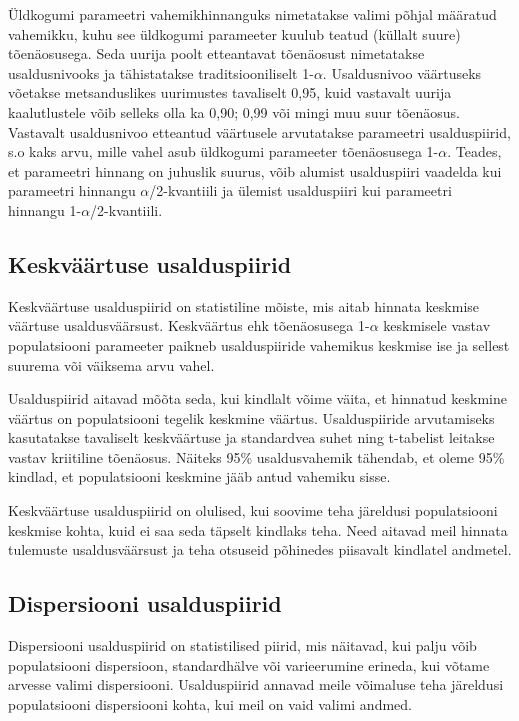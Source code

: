 \documentclass[
]{book}
\begin{document}
Üldkogumi parameetri vahemikhinnanguks nimetatakse valimi põhjal määratud vahemikku, kuhu see üldkogumi parameeter kuulub teatud (küllalt suure) tõenäosusega. Seda uurija poolt etteantavat tõenäosust nimetatakse usaldusnivooks ja tähistatakse traditsiooniliselt 1-\(\alpha\). Usaldusnivoo väärtuseks võetakse metsanduslikes uurimustes tavaliselt 0,95, kuid vastavalt uurija kaalutlustele võib selleks olla ka 0,90; 0,99 või mingi muu suur tõenäosus. Vastavalt usaldusnivoo etteantud väärtusele arvutatakse parameetri usalduspiirid, s.o kaks arvu, mille vahel asub üldkogumi parameeter tõenäosusega 1-\(\alpha\). Teades, et parameetri hinnang on juhuslik suurus, võib alumist usalduspiiri vaadelda kui parameetri hinnangu \(\alpha\)/2-kvantiili ja ülemist usalduspiiri kui parameetri hinnangu 1-\(\alpha\)/2-kvantiili.

\subsection{Keskväärtuse usalduspiirid}\label{keskvuxe4uxe4rtuse-usalduspiirid}

Keskväärtuse usalduspiirid on statistiline mõiste, mis aitab hinnata keskmise väärtuse usaldusväärsust. Keskväärtus ehk tõenäosusega 1-\(\alpha\) keskmisele vastav populatsiooni parameeter paikneb usalduspiiride vahemikus keskmise ise ja sellest suurema või väiksema arvu vahel.

Usalduspiirid aitavad mõõta seda, kui kindlalt võime väita, et hinnatud keskmine väärtus on populatsiooni tegelik keskmine väärtus. Usalduspiiride arvutamiseks kasutatakse tavaliselt keskväärtuse ja standardvea suhet ning t-tabelist leitakse vastav kriitiline tõenäosus. Näiteks 95\% usaldusvahemik tähendab, et oleme 95\% kindlad, et populatsiooni keskmine jääb antud vahemiku sisse.

Keskväärtuse usalduspiirid on olulised, kui soovime teha järeldusi populatsiooni keskmise kohta, kuid ei saa seda täpselt kindlaks teha. Need aitavad meil hinnata tulemuste usaldusväärsust ja teha otsuseid põhinedes piisavalt kindlatel andmetel.

\subsection{Dispersiooni usalduspiirid}\label{dispersiooni-usalduspiirid}

Dispersiooni usalduspiirid on statistilised piirid, mis näitavad, kui palju võib populatsiooni dispersioon, standardhälve või varieerumine erineda, kui võtame arvesse valimi dispersiooni. Usalduspiirid annavad meile võimaluse teha järeldusi populatsiooni dispersiooni kohta, kui meil on vaid valimi andmed.
\end{document}
